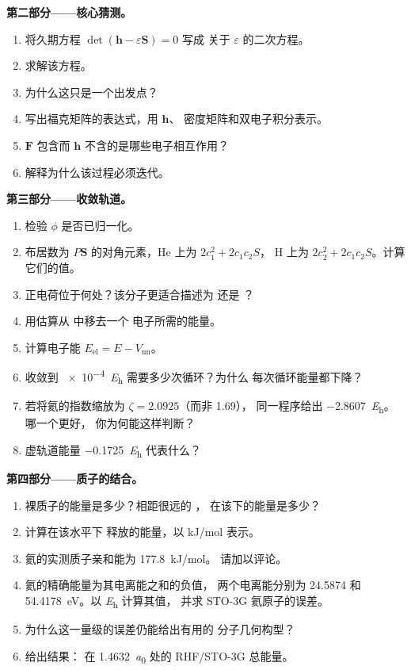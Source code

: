 \begin{problem}
\medskip\noindent\textbf{第二部分——核心猜测。}
\begin{enumerate}[resume]
  \item 将久期方程 $\det(\mathbf h - \varepsilon\mathbf S) = 0$ 写成
        关于 $\varepsilon$ 的二次方程。
  \item 求解该方程。
  \item 为什么这只是一个出发点？
  \item 写出福克矩阵的表达式，用 $\mathbf h$、
        密度矩阵和双电子积分表示。
  \item $\mathbf F$ 包含而 $\mathbf h$ 不含的是哪些电子相互作用？
  \item 解释为什么该过程必须迭代。
\end{enumerate}

\medskip\noindent\textbf{第三部分——收敛轨道。}
\begin{enumerate}[resume]
  \item 检验 $\phi$ 是否已归一化。
  \item 布居数为 $P\mathbf S$ 的对角元素，He 上为 $2c_1^2 + 2c_1c_2S$，
        H 上为 $2c_2^2 + 2c_1c_2S$。计算它们的值。
  \item 正电荷位于何处？该分子更适合描述为
         还是 ？
  \item 用估算从  中移去一个
        电子所需的能量。
  \item 计算电子能 $E_{\mathrm{el}} = E - V_{\mathrm{nn}}$。
  \item 收敛到 \qty{e-4}{\hartree} 需要多少次循环？为什么
        每次循环能量都下降？
  \item 若将氦的指数缩放为 $\zeta = 2.0925$（而非 1.69），
        同一程序给出 \qty{-2.8607}{\hartree}。哪一个更好，
        你为何能这样判断？
  \item 虚轨道能量 \qty{-0.1725}{\hartree} 代表什么？
\end{enumerate}

\medskip\noindent\textbf{第四部分——质子的结合。}
\begin{enumerate}[resume]
  \item 裸质子的能量是多少？相距很远的 ，
        在该下的能量是多少？
  \item 计算在该水平下  释放的能量，以
        \unit{kJ/mol} 表示。
  \item 氦的实测质子亲和能为 \qty{177.8}{kJ/mol}。
        请加以评论。
  \item 氦的精确能量为其电离能之和的负值，
        两个电离能分别为 24.5874 和 \qty{54.4178}{eV}。以 \unit{\hartree} 计算其值，
        并求 STO-3G 氦原子的误差。
  \item 为什么这一量级的误差仍能给出有用的
        分子几何构型？
  \item 给出结果： 在
        \qty{1.4632}{\bohr} 处的 RHF/STO-3G 总能量。
\end{enumerate}
\end{problem}
